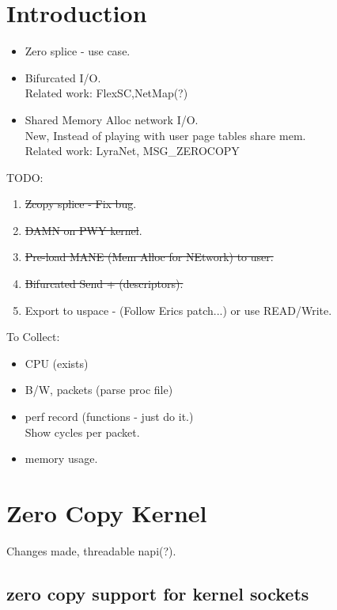 \documentclass[newfonts=false,format=sigconf,9pt,letterpaper]{acmart}
\begin{document}
\maketitle
\sloppypar

\section{Introduction}
\begin{itemize}
    \item Zero splice - use case.
    \item Bifurcated I/O.\\Related work: FlexSC,NetMap(?)
    \item Shared Memory Alloc network I/O.\\ New, Instead of playing with user page tables share mem.\\ Related work: LyraNet, MSG\_ZEROCOPY\cite{desendmsg}
\end{itemize}
\smallskip
TODO:\\
\begin{enumerate}
    \item \st{Zcopy splice - Fix bug}.
    \item \st{DAMN on PWY kernel}.
    \item \st{Pre-load MANE (Mem Alloc for NEtwork) to user.} 
    \item \st{Bifurcated Send + (descriptors).}
    \item Export to uspace - (Follow Erics patch...) or use READ/Write.
\end{enumerate}
\smallskip
To Collect:\\
\begin{itemize}
    \item CPU (exists)
    \item B/W, packets (parse proc file)
    \item perf record (functions - just do it.)\\
    Show cycles per packet.
    \item memory usage.
\end{itemize}

\section{Zero Copy Kernel}
Changes made, threadable napi(?).
\subsection{zero copy support for kernel sockets}
\end{document}
